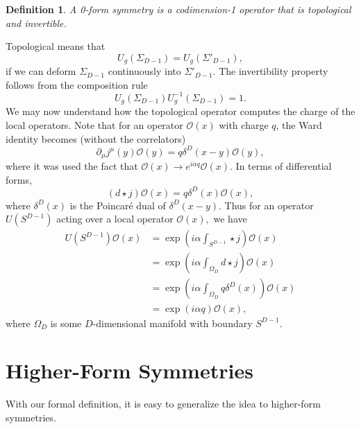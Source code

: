 \documentclass{article}
\newtheorem{definition}{Definition}
\begin{document}
\begin{definition}
	A 0-form symmetry is a codimension-1 operator that is topological and invertible.
\end{definition}
Topological means that
\begin{equation}
	U_g(\Sigma_{D-1})=U_g(\Sigma'_{D-1}),
\end{equation}
if we can deform $\Sigma_{D-1}$ continuously into $\Sigma'_{D-1}.$  The invertibility property follows from the composition rule 
\begin{equation}
	U_g(\Sigma_{D-1})U^{-1}_g(\Sigma_{D-1})=1.
\end{equation}
We may now understand how the topological operator computes the charge of the local operators. Note that for an operator $\mathcal{O}(x) $ with charge $q$, the Ward identity becomes (without the correlators) 
\begin{equation}
	\partial_\mu j^\mu(y)\mathcal{O}(y)=q\delta^{D}(x-y)\mathcal{O}(y),
\end{equation}
where it was used the fact that $\mathcal{O}(x)\to e^{i\alpha q}\mathcal{O}(x)$. In terms of differential forms, 
\begin{equation}
	(d\star j)\mathcal{O}(x)=q\delta^{D}(x)\mathcal{O}(x),
\end{equation}
where $\delta^D(x)$ is the Poincaré dual of $\delta^D(x-y)$. Thus for an operator $U(S^{D-1})$ acting over a local operator $\mathcal{O}(x), $ we have 
\begin{equation}
 \begin{split}
 	U(S^{D-1})\mathcal{O}(x)&=\exp\left(i\alpha\int_{S^{D-1}}\star j\right)\mathcal{O}(x)\\&=\exp\left(i\alpha\int_{\Omega_D}d\star j\right)\mathcal{O}(x)\\&=\exp\left(i\alpha\int_{\Omega_D}q\delta^D(x)\right)\mathcal O(x)\\&=\exp(i\alpha q)\mathcal{O}(x),
 \end{split}
\end{equation}
where $\Omega_D$ is some $D$-dimensional manifold with boundary $S^{D-1}$. 
\section{Higher-Form Symmetries}
With our formal definition, it is easy to generalize the idea to higher-form symmetries. 
\end{document}

